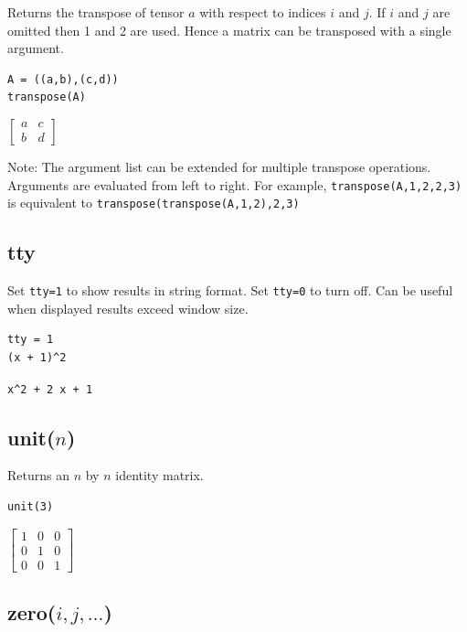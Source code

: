 \documentclass[12pt]{article}
\begin{document}
Returns the transpose of tensor $a$ with respect to indices $i$ and $j$.
If $i$ and $j$ are omitted then 1 and 2 are used.
Hence a matrix can be transposed with a single argument.

{\color{blue}
\begin{verbatim}
A = ((a,b),(c,d))
transpose(A)
\end{verbatim}
}

\noindent
$\displaystyle
\begin{bmatrix}
a & c
\\[1ex]
b & d
\end{bmatrix}
$

\bigskip
\noindent
Note:
The argument list can be extended for multiple transpose operations.
Arguments are evaluated from left to right.
For example,
\verb$transpose(A,1,2,2,3)$
is equivalent to
\verb$transpose(transpose(A,1,2),2,3)$

\subsection*{tty}

Set \verb$tty=1$ to show results in string format.
Set \verb$tty=0$ to turn off.
Can be useful when displayed results exceed window size.

{\color{blue}
\begin{verbatim}
tty = 1
(x + 1)^2
\end{verbatim}
}

\noindent
\verb$x^2 + 2 x + 1$

\subsection*{unit($n$)}

Returns an $n$ by $n$ identity matrix.

{\color{blue}
\begin{verbatim}
unit(3)
\end{verbatim}
}

\noindent
$\displaystyle
\begin{bmatrix}
1 & 0 & 0
\\[1ex]
0 & 1 & 0
\\[1ex]
0 & 0 & 1
\end{bmatrix}
$

\subsection*{zero($i,j,\ldots$)}
\end{document}
